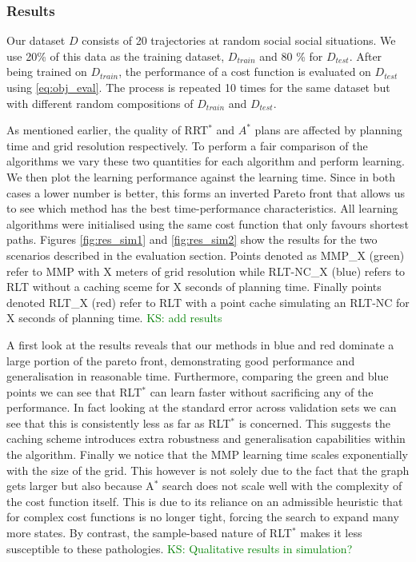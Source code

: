 \documentclass{article}  %
\newcommand{\ks}[1]{\textcolor{green}{KS: #1}}
\begin{document}
	\subsubsection{Results}

	Our dataset $D$ consists of 20 trajectories at random social social situations. We use 20\% of this data as the training dataset,  $D_{train}$ and 80 \% for $D_{test}$. After being trained on $D_{train}$, the performance of a cost function is evaluated on $D_{test}$ using \eqref{eq:obj_eval}. The process is repeated 10 times for the same dataset but with different random compositions of $D_{train}$ and $D_{test}$. 
	
	As mentioned earlier, the quality of RRT$^*$ and $A^*$ plans are affected by planning time and grid resolution respectively. To perform a fair comparison of the algorithms we vary these two quantities for each algorithm and perform learning. We then plot the learning performance against the learning time. Since in both cases a lower number is better, this forms an inverted Pareto front that allows us to see which method has the best time-performance characteristics. All learning algorithms were initialised using the same cost function that only favours shortest paths. Figures \ref{fig:res_sim1} and \ref{fig:res_sim2} show the results for the two scenarios described in the evaluation section. Points denoted as MMP\_X (green) refer to MMP with X meters of grid resolution while RLT-NC\_X (blue) refers to RLT without a caching sceme for X seconds of planning time. Finally points denoted RLT\_X (red) refer to RLT with a point cache simulating an RLT-NC for X seconds of planning time. \ks{add results}

	A first look at the results reveals that our methods in blue and red dominate a large portion of the pareto front, demonstrating good performance and generalisation in reasonable time. Furthermore, comparing the green and blue points we can see that RLT$^*$ can learn faster without sacrificing any of the performance. In fact looking at the standard error across validation sets we can see that this is consistently less as far as RLT$^*$ is concerned. This suggests the caching scheme introduces extra robustness and generalisation capabilities within the algorithm. Finally we notice that the MMP learning time scales exponentially with the size of the grid. This however is not solely due to the fact that the graph gets larger but also because A$^*$ search does not scale well with the complexity of the cost function itself. This is due to its reliance on an admissible heuristic that for complex cost functions is no longer tight, forcing the search to expand many more states. By contrast, the sample-based nature of RLT$^*$ makes it less susceptible to these pathologies.  \ks{Qualitative results in simulation?}
\end{document}
